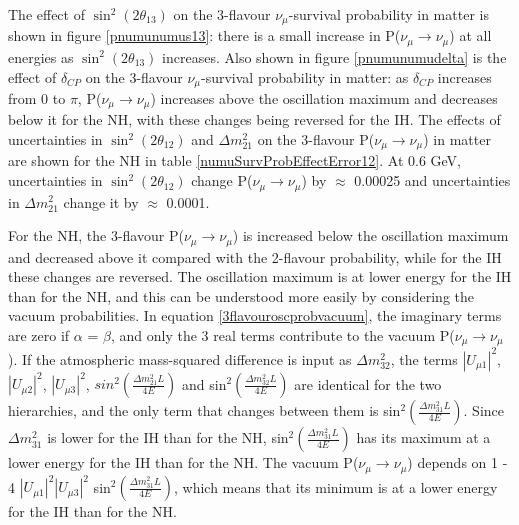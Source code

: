 The effect of $\sin^{2}(2 \theta_{13})$ on the 3-flavour $\nu_{\mu}$-survival probability in matter 
is shown in figure \ref{pnumunumus13}: there is a small increase in P($\nu_{\mu} \rightarrow \nu_{\mu}$) at all energies as 
$\sin^{2}(2 \theta_{13})$ increases. Also shown in figure \ref{pnumunumudelta} is the effect of $\delta_{CP}$ on the 3-flavour $\nu_{\mu}$-survival 
probability in matter: as $\delta_{CP}$ increases from 0 to $\pi$, P($\nu_{\mu}\rightarrow\nu_{\mu}$) increases above the oscillation 
maximum and decreases below it for the NH, with these changes being reversed for the IH. 
The effects of uncertainties in $\sin^{2}(2 \theta_{12})$ and $\Delta m_{21}^{2}$ on the 3-flavour P($\nu_{\mu}\rightarrow\nu_{\mu}$) in matter 
are shown for the NH in table \ref{numuSurvProbEffectError12}. At 0.6 GeV, uncertainties in $\sin^{2}(2 \theta_{12})$ change 
P($\nu_{\mu}\rightarrow\nu_{\mu}$) by $\approx$ 0.00025 and uncertainties in $\Delta m_{21}^{2}$ change it by $\approx$ 0.0001. 

For the NH, the 3-flavour P($\nu_{\mu}\rightarrow\nu_{\mu}$) is increased below the oscillation
maximum and decreased above it compared with the 2-flavour probability, while for the IH these changes are reversed. The oscillation maximum is at
lower energy for the IH than for the NH, and this can be understood more easily by considering the vacuum probabilities. In equation 
\ref{3flavouroscprobvacuum}, the imaginary terms are zero if $\alpha$ = $\beta$, and only the 3 real terms contribute to the vacuum P($\nu_{\mu} \rightarrow \nu_{\mu}$). 
If the atmospheric mass-squared difference is input as $\Delta m^{2}_{32}$, the terms $|U_{\mu 1}|^{2}$, $|U_{\mu 2}|^{2}$, $|U_{\mu 3}|^{2}$, 
$sin^{2} \left( \frac{\Delta m_{21}^{2} L}{4E} \right)$ and sin$^{2} \left( \frac{\Delta m_{32}^{2} L}{4E} \right)$ are identical for the two hierarchies, 
and the only term that changes between them is sin$^{2} \left( \frac{\Delta m_{31}^{2} L}{4E} \right)$. Since $\Delta m_{31}^{2}$ is lower for the 
IH than for the NH, sin$^{2} \left( \frac{\Delta m_{31}^{2} L}{4E} \right)$ has its maximum at a lower energy for the IH than for the NH. The vacuum 
P($\nu_{\mu}\rightarrow\nu_{\mu}$) depends on 1 - 4 $|U_{\mu 1}|^{2}$$|U_{\mu 3}|^{2}$ sin$^{2} \left( \frac{\Delta m_{31}^{2} L}{4E} \right)$, which means that its minimum is 
at a lower energy for the IH than for the NH.     

